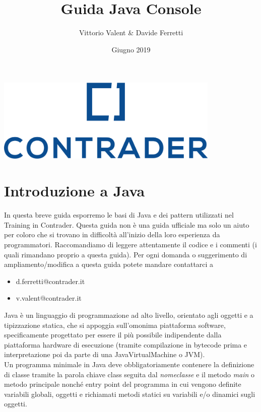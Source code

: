 \documentclass[a4paper,12 pt]{article}
\title{Guida Java Console}
\author{Vittorio Valent \& Davide Ferretti}
\date{Giugno 2019}
\begin{document}
	\thispagestyle{empty}
	\begin{center}
		\includegraphics[height=4cm]{Logo.png}
	\end{center}
	
	\maketitle
	\newpage
	\tableofcontents
	\newpage
	\section{Introduzione a Java}
	In questa breve guida esporremo le basi di Java e dei pattern utilizzati nel Training in Contrader. Questa guida non è una guida ufficiale ma solo un aiuto per coloro che si trovano in difficoltà all'inizio della loro esperienza da programmatori. Raccomandiamo di leggere attentamente il codice e i commenti (i quali rimandano proprio a questa guida). Per ogni domanda o suggerimento di ampliamento/modifica a questa guida potete mandare contattarci a\\
	
	\begin{itemize}
		\item  d.ferretti@contrader.it
		\item  v.valent@contrader.it
	\end{itemize}
	
	\noindent Java è un linguaggio di programmazione ad alto livello, orientato agli oggetti e a tipizzazione statica, che si appoggia sull'omonima piattaforma software, specificamente progettato per essere il più possibile indipendente dalla piattaforma hardware di esecuzione (tramite compilazione in bytecode prima e interpretazione poi da parte di una JavaVirtualMachine o JVM).\\
	
	\noindent Un programma minimale in Java deve obbligatoriamente contenere la definizione di classe tramite la parola chiave class seguita dal \textit{nomeclasse} e il metodo \textit{main} o metodo principale nonché entry point del programma in cui vengono definite variabili globali, oggetti e richiamati metodi statici su variabili e/o dinamici sugli oggetti.\\
	
\end{document}
